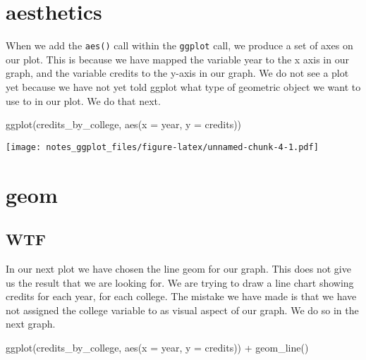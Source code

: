 \documentclass[
]{book}
\newenvironment{Shaded}{\begin{snugshade}}{\end{snugshade}}
\newcommand{\AttributeTok}[1]{\textcolor[rgb]{0.77,0.63,0.00}{#1}}
\newcommand{\FunctionTok}[1]{\textcolor[rgb]{0.00,0.00,0.00}{#1}}
\newcommand{\NormalTok}[1]{#1}
\newcommand{\SpecialCharTok}[1]{\textcolor[rgb]{0.00,0.00,0.00}{#1}}
\begin{document}
\hypertarget{aesthetics}{%
\section{aesthetics}\label{aesthetics}}

When we add the \texttt{aes()} call within the \texttt{ggplot} call, we produce a set of axes on our plot. This is because we have mapped the variable year to the x axis in our graph, and the variable credits to the y-axis in our graph. We do not see a plot yet because we have not yet told ggplot what type of geometric object we want to use to in our plot. We do that next.

\begin{Shaded}
\begin{Highlighting}[]
\FunctionTok{ggplot}\NormalTok{(credits\_by\_college, }\FunctionTok{aes}\NormalTok{(}\AttributeTok{x =}\NormalTok{ year, }\AttributeTok{y =}\NormalTok{ credits))}
\end{Highlighting}
\end{Shaded}

\texttt{[image: notes\_ggplot\_files/figure-latex/unnamed-chunk-4-1.pdf]}

\hypertarget{geom}{%
\section{geom}\label{geom}}

\hypertarget{wtf}{%
\subsection{WTF}\label{wtf}}

In our next plot we have chosen the line geom for our graph. This does not give us the result that we are looking for. We are trying to draw a line chart showing credits for each year, for each college. The mistake we have made is that we have not assigned the college variable to as visual aspect of our graph. We do so in the next graph.

\begin{Shaded}
\begin{Highlighting}[]
\FunctionTok{ggplot}\NormalTok{(credits\_by\_college, }\FunctionTok{aes}\NormalTok{(}\AttributeTok{x =}\NormalTok{ year, }\AttributeTok{y =}\NormalTok{ credits)) }\SpecialCharTok{+} \FunctionTok{geom\_line}\NormalTok{()}
\end{Highlighting}
\end{Shaded}
\end{document}

